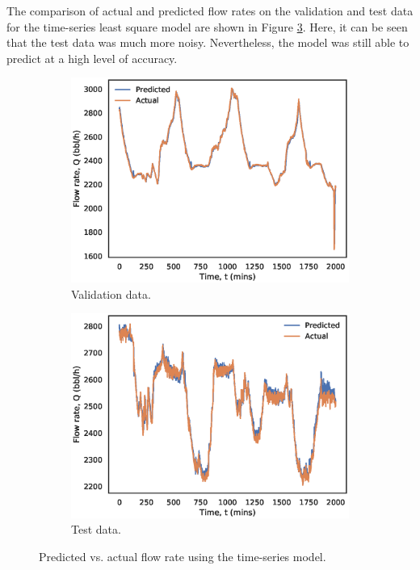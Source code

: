 The comparison of actual and predicted flow rates on the validation and test data for the time-series least square model are shown in Figure \ref{fig:08ts_ls}.   Here, it can be seen that the test data was much more noisy.  Nevertheless, the model was still able to predict at a high level of accuracy.
\begin{figure}[h]
    \centering
     \begin{subfigure}[b]{0.48\textwidth}
         \includegraphics[width=\textwidth]{images/suncor/08ts_validation.eps}
         \caption{Validation data.}
         \label{fig:08ts_valid}
     \end{subfigure}
     \begin{subfigure}[b]{0.48\textwidth}
         \includegraphics[width=\textwidth]{images/suncor/08ts_test.eps}
         \caption{Test data.}
         \label{fig:08ts_test}
     \end{subfigure}
        \caption{Predicted vs. actual flow rate using the time-series model.}
        \label{fig:08ts_ls}
\end{figure}


